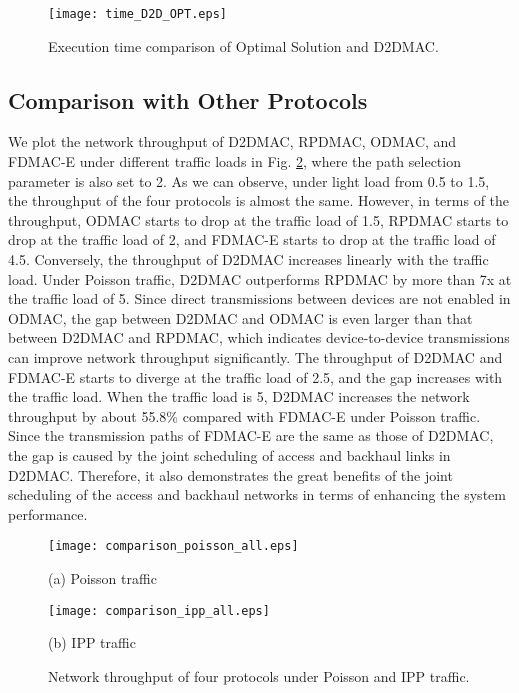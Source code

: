 \documentclass[journal]{IEEEtran}
\begin{document}
\begin{figure}[htbp]
\begin{minipage}[t]{1\linewidth}
\centering
\texttt{[image: time\_D2D\_OPT.eps]}
\end{minipage}\caption{Execution time comparison of Optimal Solution and D2DMAC.}
\label{fig:time_opt} \vspace*{-3mm}
\end{figure}





\subsection{Comparison with Other Protocols}

We plot the network throughput of D2DMAC, RPDMAC, ODMAC, and FDMAC-E under different traffic loads in Fig.
\ref{fig:comparison}, where the path selection parameter  is also set to 2. As we can
observe, under light load from 0.5 to 1.5, the throughput of the four protocols is almost the same.
However, in terms of the throughput, ODMAC starts to drop at the traffic load of 1.5, RPDMAC starts to drop at the traffic load of 2, and FDMAC-E starts to drop at the traffic load of 4.5. Conversely, the throughput of D2DMAC increases
linearly with the traffic load. Under Poisson traffic, D2DMAC outperforms RPDMAC by more than
7x at the traffic load of 5. Since direct transmissions between devices are not enabled in
ODMAC, the gap between D2DMAC and ODMAC is even larger than that between D2DMAC and RPDMAC, which
indicates device-to-device transmissions can improve network throughput significantly. The throughput of D2DMAC and FDMAC-E starts to diverge at the traffic load of 2.5, and the gap increases with the traffic load. When the traffic load is 5, D2DMAC increases the network throughput by about 55.8\% compared with FDMAC-E under Poisson traffic. Since the transmission paths of FDMAC-E are the same as those of D2DMAC, the gap is caused by the joint scheduling of access and backhaul links in D2DMAC. Therefore, it also demonstrates the great benefits of the joint scheduling of the access and backhaul
networks in terms of enhancing the system performance.








\begin{figure}[htbp]
\begin{minipage}[t]{0.5\linewidth}
\centering
\texttt{[image: comparison\_poisson\_all.eps]}
\centerline{\small (a) Poisson traffic}
\end{minipage}\begin{minipage}[t]{0.5\linewidth}
\centering
\texttt{[image: comparison\_ipp\_all.eps]}
\centerline{\small (b) IPP traffic}
\end{minipage}\caption{Network throughput of four protocols under Poisson and IPP traffic.}
\label{fig:comparison} \vspace*{-3mm}
\end{figure}
\end{document}
